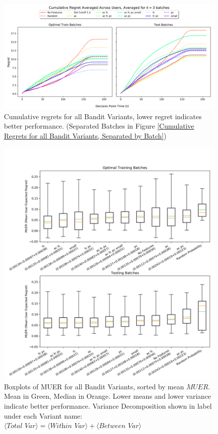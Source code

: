\begin{figure}[h!]
\includegraphics[width=1.3\textwidth,center]{figures/cum_regret_comparison_grouped.png}%
\caption{Cumulative regrets for all Bandit Variants, lower regret indicates better performance. (Separated Batches in Figure \ref{Cumulative Regrets for all Bandit Variants, Separated by Batch})}
\label{Cumulative Regrets for all Bandit Variants}
\end{figure}


\begin{figure}[H]
\includegraphics[width=1.25\textwidth,center]{figures/boxplots_muer.png}%
\caption{Boxplots of MUER for all Bandit Variants, sorted by mean $MUER$.  Mean in Green, Median in Orange.  Lower means and lower variance indicate better performance.  Variance Decomposition shown in label under each Variant name: $\langle\textit{Total Var}\rangle = \langle\textit{Within Var}\rangle + \langle\textit{Between Var}\rangle$}
\label{Boxplots of MUER for all Bandit Variants, sorted by mean MUER}
\end{figure}



